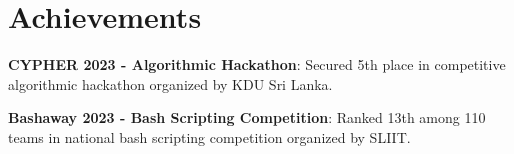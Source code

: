 \section{Achievements}
  \resumeSubHeadingListStart
    \item{
      \textbf{CYPHER 2023 - Algorithmic Hackathon}: Secured 5th place in competitive algorithmic hackathon organized by KDU Sri Lanka.
    }
    \vspace{-5pt}
    \item{
      \textbf{Bashaway 2023 - Bash Scripting Competition}: Ranked 13th among 110 teams in national bash scripting competition organized by SLIIT.
    }
  \resumeSubHeadingListEnd

